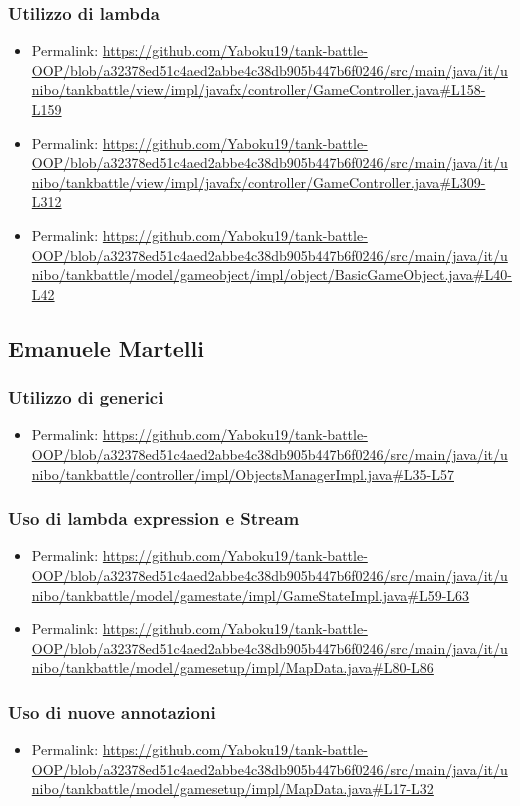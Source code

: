 \documentclass[a4paper,12pt]{report}
\begin{document}
\subsubsection*{Utilizzo di lambda}
\begin{itemize}
    \item Permalink: \url{https://github.com/Yaboku19/tank-battle-OOP/blob/a32378ed51c4aed2abbe4c38db905b447b6f0246/src/main/java/it/unibo/tankbattle/view/impl/javafx/controller/GameController.java#L158-L159}
    \item Permalink: \url{https://github.com/Yaboku19/tank-battle-OOP/blob/a32378ed51c4aed2abbe4c38db905b447b6f0246/src/main/java/it/unibo/tankbattle/view/impl/javafx/controller/GameController.java#L309-L312}
    \item Permalink: \url{https://github.com/Yaboku19/tank-battle-OOP/blob/a32378ed51c4aed2abbe4c38db905b447b6f0246/src/main/java/it/unibo/tankbattle/model/gameobject/impl/object/BasicGameObject.java#L40-L42}
\end{itemize}
\newpage
\subsection*{Emanuele Martelli}
\subsubsection*{Utilizzo di generici}
\begin{itemize}
    \item Permalink: \url{https://github.com/Yaboku19/tank-battle-OOP/blob/a32378ed51c4aed2abbe4c38db905b447b6f0246/src/main/java/it/unibo/tankbattle/controller/impl/ObjectsManagerImpl.java#L35-L57}
\end{itemize}
\subsubsection*{Uso di lambda expression e Stream} 
\begin{itemize}
    \item Permalink: \url{https://github.com/Yaboku19/tank-battle-OOP/blob/a32378ed51c4aed2abbe4c38db905b447b6f0246/src/main/java/it/unibo/tankbattle/model/gamestate/impl/GameStateImpl.java#L59-L63}
    \item Permalink: \url{https://github.com/Yaboku19/tank-battle-OOP/blob/a32378ed51c4aed2abbe4c38db905b447b6f0246/src/main/java/it/unibo/tankbattle/model/gamesetup/impl/MapData.java#L80-L86}
\end{itemize}
\subsubsection*{Uso di nuove annotazioni}
\begin{itemize}
    \item Permalink: \url{https://github.com/Yaboku19/tank-battle-OOP/blob/a32378ed51c4aed2abbe4c38db905b447b6f0246/src/main/java/it/unibo/tankbattle/model/gamesetup/impl/MapData.java#L17-L32}
\end{itemize}
\end{document}

